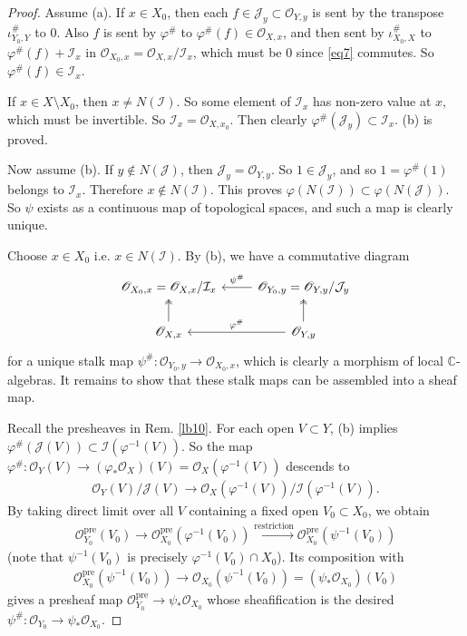 \documentclass[12pt,b5paper,notitlepage]{report}
\theoremstyle{definition}
\theoremstyle{plain}
\newcommand{\mc}{\mathcal}
\newcommand{\scr}{\mathscr}
\newcommand{\Cbb}{\mathbb C}
\newcommand{\pre}{\mathrm{pre}}
\numberwithin{equation}{section}
\begin{document}
\begin{proof}
Assume (a). If $x\in X_0$, then each $f\in\mc J_y\subset\scr O_{Y,y}$ is sent by the transpose $\iota_{Y_0,Y}^\#$ to $0$. Also $f$ is sent by $\varphi^\#$ to $\varphi^\#(f)\in\scr O_{X,x}$, and then sent by $\iota_{X_0,X}^\#$ to $\varphi^\#(f)+\mc I_x$ in $\scr O_{X_0,x}=\scr O_{X,x}/\mc I_x$, which must be $0$ since \eqref{eq7} commutes. So $\varphi^\#(f)\in\mc I_x$.

If $x\in X\setminus X_0$, then $x\neq N(\mc I)$. So some element of $\mc I_x$ has non-zero value at $x$, which must be invertible. So $\mc I_x=\scr O_{X,x_0}$. Then clearly $\varphi^\#(\mc J_y)\subset\mc I_x$. (b) is proved.

Now assume (b). If $y\notin N(\mc J)$, then $\mc J_y=\scr O_{Y,y}$. So $1\in\mc J_y$, and so $1=\varphi^\#(1)$ belongs to $\mc I_x$. Therefore $x\notin N(\mc I)$. This proves $\varphi(N(\mc I))\subset\varphi(N(\mc J))$. So $\psi$ exists as a continuous map of topological spaces, and such a map is clearly unique.

Choose $x\in X_0$ i.e. $x\in N(\mc I)$. By (b), we have a commutative diagram
\begin{equation*}
\begin{tikzcd}
\scr O_{X_0,x}=\scr O_{X,x}/\mc I_x                     & \scr O_{Y_0,y}=\scr O_{Y,y}/\mc J_y \arrow[l,"\psi^\#"']                      \\
\scr O_{X,x} \arrow[u, two heads] & \scr O_{Y,y} \arrow[l,"\varphi^\#"'] \arrow[u, two heads]
\end{tikzcd}
\end{equation*}
for a unique stalk map $\psi^\#:\scr O_{Y_0,y}\rightarrow\scr O_{X_0,x}$, which is clearly a morphism of local $\Cbb$-algebras. It remains to show that these stalk maps can be assembled into a sheaf map. 

Recall the presheaves in Rem. \ref{lb10}. For each open $V\subset Y$,  (b) implies $\varphi^\#(\mc J(V))\subset\mc I(\varphi^{-1}(V))$. So the map $\varphi^\#:\scr O_Y(V)\rightarrow (\varphi_*\scr O_X)(V)=\scr O_X(\varphi^{-1}(V))$ descends to
\begin{align*}
\scr O_Y(V)/\mc J(V)\rightarrow \scr O_X(\varphi^{-1}(V))/\mc I(\varphi^{-1}(V)).
\end{align*}
By taking direct limit over all $V$ containing a fixed open $V_0\subset X_0$, we obtain
\begin{align*}
\scr O_{Y_0}^\pre(V_0)\rightarrow \scr O_{X_0}^\pre(\varphi^{-1}(V_0))\xrightarrow{\text{restriction}}\scr O_{X_0}^\pre(\psi^{-1}(V_0))
\end{align*}
(note that $\psi^{-1}(V_0)$ is precisely $\varphi^{-1}(V_0)\cap X_0$). Its composition with
\begin{align*}
\scr O_{X_0}^\pre(\psi^{-1}(V_0))\rightarrow\scr O_{X_0}(\psi^{-1}(V_0))=(\psi_*\scr O_{X_0})(V_0)
\end{align*}
gives a presheaf map $\scr O_{Y_0}^\pre\rightarrow\psi_*\scr O_{X_0}$  whose sheafification is the desired $\psi^\#:\scr O_{Y_0}\rightarrow\psi_*\scr O_{X_0}$.
\end{proof}
\end{document}
